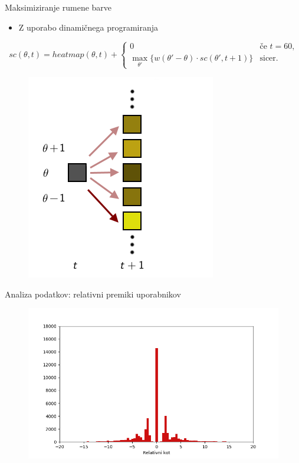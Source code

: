 \begin{frame}{Maksimiziranje rumene barve}
  \begin{itemize}
    \item Z uporabo dinamičnega programiranja
  \end{itemize}

\begin{displaymath}
  sc(\theta, t) = heatmap(\theta, t) + \left\{ \begin{array}{ll}
                                            0 & \textrm{če $t = 60$,}\\
                                            \displaystyle \max_{\theta'}\{w(\theta'-\theta) \cdot sc(\theta', t+1)\} & \textrm{sicer.}
  \end{array} \right.
\end{displaymath}
  \begin{figure}
    \includegraphics[scale=0.57]{img/dp2.png}
  \end{figure}
\end{frame}

\begin{frame}{Analiza podatkov: relativni premiki uporabnikov}
  \begin{figure}
    \includegraphics[scale=0.55]{img/rel_moves.png}
  \end{figure}
\end{frame}

